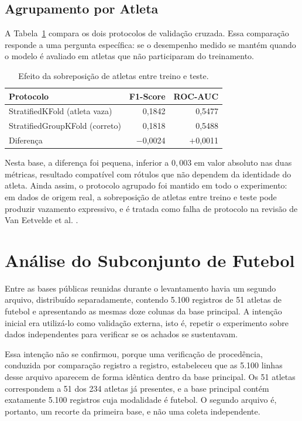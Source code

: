 \subsection{Agrupamento por Atleta}
A Tabela~\ref{tab:leakage_grupo} compara os dois protocolos de validação cruzada. Essa comparação responde a uma pergunta específica: se o desempenho medido se mantém quando o modelo é avaliado em atletas que não participaram do treinamento.

\begin{table}[H]
\centering
\caption{Efeito da sobreposição de atletas entre treino e teste.}
\label{tab:leakage_grupo}
\begin{tabular}{lrr}
\toprule
Protocolo & F1-Score & ROC-AUC \\
\midrule
StratifiedKFold (atleta vaza)    & 0{,}1842 & 0{,}5477 \\
StratifiedGroupKFold (correto)   & 0{,}1818 & 0{,}5488 \\
\addlinespace
Diferença & $-$0{,}0024 & $+$0{,}0011 \\
\bottomrule
\end{tabular}
\end{table}

Nesta base, a diferença foi pequena, inferior a $0{,}003$ em valor absoluto nas duas métricas, resultado compatível com rótulos que não dependem da identidade do atleta. Ainda assim, o protocolo agrupado foi mantido em todo o experimento: em dados de origem real, a sobreposição de atletas entre treino e teste pode produzir vazamento expressivo, e é tratada como falha de protocolo na revisão de Van Eetvelde et al. \cite{vaneetvelde2021}.

\section{Análise do Subconjunto de Futebol}
\label{sec:soccer}

Entre as bases públicas reunidas durante o levantamento havia um segundo arquivo, distribuído separadamente, contendo 5.100 registros de 51 atletas de futebol e apresentando as mesmas doze colunas da base principal. A intenção inicial era utilizá-lo como validação externa, isto é, repetir o experimento sobre dados independentes para verificar se os achados se sustentavam.

Essa intenção não se confirmou, porque uma verificação de procedência, conduzida por comparação registro a registro, estabeleceu que as 5.100 linhas desse arquivo aparecem de forma idêntica dentro da base principal. Os 51 atletas correspondem a 51 dos 234 atletas já presentes, e a base principal contém exatamente 5.100 registros cuja modalidade é futebol. O segundo arquivo é, portanto, um recorte da primeira base, e não uma coleta independente.

